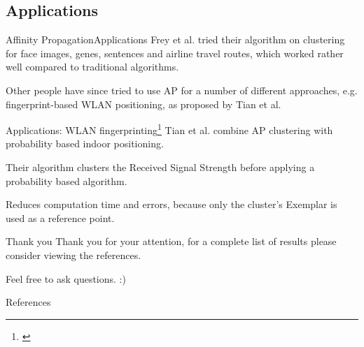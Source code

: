 \documentclass{beamer}
\begin{document}
\subsection{Applications}
\begin{frame}{Affinity Propagation}{Applications}
	Frey et al. tried their algorithm on clustering for face images, genes, sentences and airline travel routes, which worked rather well compared to traditional algorithms. \cite{frey2007clustering}
	
	Other people have since tried to use AP for a number of different approaches, e.g. fingerprint-based WLAN positioning, as proposed by Tian et al. \cite{tian2013fingerprint}
\end{frame}
\begin{frame}{Applications: WLAN fingerprinting\footnote{\cite{tian2013fingerprint}}}
	Tian et al. combine AP clustering with probability based indoor positioning.
	
	Their algorithm clusters the \alert{Received Signal Strength} before applying a probability based algorithm.
	
	Reduces computation time and errors, because only the cluster's \alert{Exemplar} is used as a reference point.
\end{frame}
\begin{frame}{Thank you}
	Thank you for your attention, for a complete list of results please consider viewing the references.
	
	Feel free to ask questions. :)
\end{frame}
\begin{frame}{References}
	
\end{frame}
\end{document}
